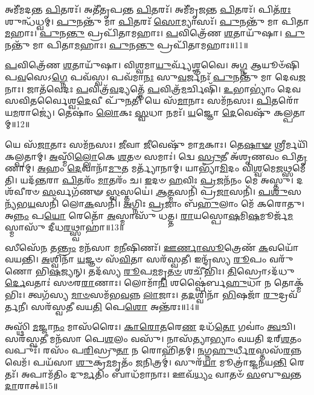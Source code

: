 𑌅𑌮𑍀᳴𑌮𑌦𑌨𑍍𑌤 \ul{𑌪𑌿}\-𑌤𑌰𑌃᳴।
𑌅𑌤𑍀᳴𑌤𑍃𑌪𑌨𑍍𑌤 \ul{𑌪𑌿}\-𑌤𑌰𑌃᳴।
𑌅𑌮𑍀᳴𑌮𑍃𑌜𑌨𑍍𑌤 \ul{𑌪𑌿}\-𑌤𑌰𑌃᳴।
𑌪𑌿𑌤᳴\-\ul{𑌰𑌃} 𑌶𑍁𑌨𑍍𑌧᳴𑌧𑍍𑌵𑌮𑍍।
\-\ul{𑌪𑍁}\-𑌨𑌨𑍍𑌤𑍁᳴ 𑌮𑌾 \ul{𑌪𑌿}\-𑌤𑌰𑌃᳴ \ul{𑌸𑍋}\-𑌮𑍍𑌯𑌾𑌸𑌃᳴।
\-\ul{𑌪𑍁}\-𑌨𑌨𑍍𑌤𑍁᳴ 𑌮𑌾 𑌪𑌿𑌤𑌾\-\ul{𑌮}\-𑌹𑌾𑌃।
\-\ul{𑌪𑍁}\-𑌨\-\ul{𑌨𑍍𑌤𑍁} 𑌪𑍍𑌰𑌪𑌿᳴𑌤𑌾𑌮𑌹𑌾𑌃।
\-\ul{𑌪}\-𑌵𑌿𑌤𑍍𑌰𑍇᳴𑌣 \ul{𑌶}\-𑌤𑌾𑌯𑍁᳴𑌷𑌾।
\-\ul{𑌪𑍁}\-𑌨𑌨𑍍𑌤𑍁᳴ 𑌮𑌾 𑌪𑌿𑌤𑌾\-\ul{𑌮}\-𑌹𑌾𑌃।
\-\ul{𑌪𑍁}\-𑌨\-\ul{𑌨𑍍𑌤𑍁} 𑌪𑍍𑌰𑌪𑌿᳴𑌤𑌾𑌮𑌹𑌾𑌃॥11॥

\-\ul{𑌪}\-𑌵𑌿𑌤𑍍𑌰𑍇᳴𑌣 \ul{𑌶}\-𑌤𑌾𑌯𑍁᳴𑌷𑌾।
𑌵𑌿\-\ul{𑌶𑍍𑌵}\-𑌮𑌾\-\ul{𑌯𑍁}\-𑌰𑍍𑌵𑍍𑌯᳴𑌶𑍍𑌞𑌵𑍈।
𑌅\-\ul{𑌗𑍍𑌨} 𑌆𑌯𑍂𑍞᳴𑌷𑌿 𑌪\-\ul{𑌵}\-𑌸𑍇\-𑌽\-\ul{𑌗𑍍𑌨𑍇} 𑌪𑌵᳴𑌸𑍍𑌵।
𑌪𑌵᳴𑌮𑌾\-\ul{𑌨𑌃} 𑌸𑍁\-\ul{𑌵}\-𑌰𑍍𑌜𑌨𑌃᳴ \ul{𑌪𑍁}\-𑌨𑌨𑍍𑌤𑍁᳴ 𑌮𑌾 𑌦𑍇𑌵\-\ul{𑌜}\-𑌨𑌾𑌃।
𑌜𑌾𑌤᳴𑌵𑍇𑌦𑌃 \ul{𑌪}\-𑌵𑌿𑌤𑍍𑌰᳴\-\ul{𑌵}\-𑌦𑍍𑌯𑌤𑍍𑌤𑍇᳴ \ul{𑌪}\-𑌵𑌿𑌤𑍍𑌰᳴\-\ul{𑌮}\-𑌰𑍍𑌚𑌿𑌷𑌿᳴।
\-\ul{𑌉}\-𑌭𑌾𑌭𑍍𑌯𑌾𑌂॑ 𑌦𑍇𑌵 𑌸𑌵𑌿𑌤𑌰𑍍𑌵𑍈𑌶𑍍𑌵\-\ul{𑌦𑍇}\-𑌵𑍀 𑌪𑍁᳴\-\ul{𑌨}\-𑌤𑍀।
𑌯𑍇 𑌸᳴\-\ul{𑌮𑌾}\-𑌨𑌾𑌃 𑌸𑌮᳴𑌨𑌸𑌃।
\-\ul{𑌪𑌿}\-𑌤𑌰𑍋᳴ 𑌯\-\ul{𑌮}\-𑌰𑌾𑌜𑍍𑌯𑍇॑।
𑌤𑍇𑌷𑌾𑌂॑ \ul{𑌲𑍋}\-𑌕𑌃 \ul{𑌸𑍍𑌵}\-𑌧𑌾 𑌨𑌮𑌃᳴।
\-\ul{𑌯}\-𑌜𑍍𑌞𑍋 \ul{𑌦𑍇}\-𑌵𑍇𑌷𑍁᳴ 𑌕𑌲𑍍𑌪𑌤𑌾𑌮𑍍॥12॥

𑌯𑍇 𑌸᳴\-\ul{𑌜𑌾}\-𑌤𑌾𑌃 𑌸𑌮᳴𑌨𑌸𑌃।
\-\ul{𑌜𑍀}\-𑌵𑌾 \ul{𑌜𑍀}\-𑌵𑍇𑌷𑍁᳴ 𑌮𑌾\-\ul{𑌮}\-𑌕𑌾𑌃।
𑌤𑍇\-\ul{𑌷𑌾}\-\-\ul{𑍟} 𑌶𑍍𑌰𑍀𑌰𑍍𑌮𑌯𑌿᳴ 𑌕𑌲𑍍𑌪𑌤𑌾𑌮𑍍।
\-\ul{𑌅}\-𑌸𑍍𑌮𑌿𑌁\-\ul{𑌲𑍍𑌲𑍋}\-𑌕𑍇 \ul{𑌶}\-𑌤𑍞 𑌸𑌮𑌾𑌃॑।
𑌦𑍍𑌵𑍇 \ul{𑌸𑍍𑌰𑍁}\-𑌤𑍀 𑌅᳴𑌶𑍃𑌣𑌵𑌂 𑌪𑌿\-\ul{𑌤𑍃}\-𑌣𑌾𑌮𑍍।
\-\ul{𑌅}\-𑌹𑌂 \ul{𑌦𑍇}\-𑌵𑌾𑌨𑌾᳴\-\ul{𑌮𑍁}\-𑌤 𑌮𑌰𑍍𑌤𑍍𑌯𑌾᳴𑌨𑌾𑌮𑍍।
𑌯𑌾𑌭𑍍𑌯𑌾᳴\-\ul{𑌮𑌿}\-𑌦𑌂 𑌵𑌿\-\ul{𑌶𑍍𑌵}\-𑌮𑍇\-\ul{𑌜}\-𑌥𑍍𑌸𑌮𑍇᳴𑌤𑌿।
𑌯𑌦᳴\-\ul{𑌨𑍍𑌤}\-𑌰𑌾 \ul{𑌪𑌿}\-𑌤𑌰𑌂᳴ \ul{𑌮𑌾}\-𑌤𑌰𑌂᳴ 𑌚।
\-\ul{𑌇}\-𑌦𑍞 \ul{𑌹}\-𑌵𑌿𑌃 \ul{𑌪𑍍𑌰}\-𑌜𑌨᳴𑌨𑌂 𑌮𑍇 𑌅𑌸𑍍𑌤𑍁।
𑌦𑌶᳴𑌵𑍀𑌰𑍞 \ul{𑌸}\-𑌰𑍍𑌵𑌗᳴𑌣𑍟 \ul{𑌸𑍍𑌵}\-𑌸𑍍𑌤𑌯𑍇॑।
\-\ul{𑌆}\-\-\ul{𑌤𑍍𑌮}\-𑌸𑌨𑌿᳴ 𑌪𑍍𑌰\-\ul{𑌜𑌾}\-𑌸𑌨𑌿᳴।
\-\ul{𑌪}\-\-\ul{𑌶𑍁}\-𑌸𑌨𑍍𑌯᳴𑌭\-\ul{𑌯}\-𑌸𑌨𑌿᳴ 𑌲𑍋\-\ul{𑌕}\-𑌸𑌨𑌿᳴।
\-\ul{𑌅}\-𑌗𑍍𑌨𑌿𑌃 \ul{𑌪𑍍𑌰}\-𑌜𑌾𑌂 𑌬᳴\-\ul{𑌹𑍁}\-𑌲𑌾𑌂 𑌮𑍇᳴ 𑌕𑌰𑍋𑌤𑍁।
𑌅\-\ul{𑌨𑍍𑌨𑌂} 𑌪\-\ul{𑌯𑍋} 𑌰𑍇𑌤𑍋᳴ \ul{𑌅}\-𑌸𑍍𑌮𑌾𑌸𑍁᳴ 𑌧𑌤𑍍𑌤।
\-\ul{𑌰𑌾}\-𑌯𑌸𑍍𑌪𑍋\-\ul{𑌷}\-𑌮𑌿\-\ul{𑌷}\-𑌮𑍂𑌰𑍍𑌜᳴\-\ul{𑌮}\-𑌸𑍍𑌮𑌾𑌸𑍁᳴ 𑌦𑍀𑌧\-\ul{𑌰}\-𑌥𑍍𑌸𑍍𑌵𑌾𑌹𑌾॑॥13॥\anuvakamend[\-\ul{𑌇}\-\-\ul{𑌨𑍍𑌦𑍍𑌰𑌿}\-𑌯𑌾𑌯᳴ \ul{𑌪𑌿}\-𑌤𑌰𑌃᳴ \ul{𑌶}\-𑌤𑌾𑌯𑍁᳴𑌷𑌾 \ul{𑌪𑍁}\-𑌨𑌨𑍍𑌤𑍁᳴ 𑌮𑌾 𑌪𑌿𑌤𑌾\-\ul{𑌮}\-𑌹𑌾𑌃 \ul{𑌪𑍁}\-𑌨\-\ul{𑌨𑍍𑌤𑍁} 𑌪𑍍𑌰𑌪𑌿᳴𑌤𑌾𑌮𑌹𑌾𑌃 𑌕𑌲𑍍𑌪𑌤𑌾𑍟 \ul{𑌸𑍍𑌵}\-𑌸𑍍𑌤\-\ul{𑌯𑍇} 𑌪𑌞𑍍𑌚᳴ 𑌚]

𑌸𑍀𑌸𑍇᳴\-\ul{𑌨} 𑌤\-\ul{𑌨𑍍𑌤𑍍𑌰𑌂} 𑌮𑌨᳴𑌸𑌾 𑌮\-\ul{𑌨𑍀}\-𑌷𑌿𑌣𑌃᳴।
\-\ul{𑌊}\-\-\ul{𑌰𑍍𑌣𑌾}\-\-\ul{𑌸𑍂}\-𑌤𑍍𑌰𑍇𑌣᳴ \ul{𑌕}\-𑌵𑌯𑍋᳴ 𑌵𑌯𑌨𑍍𑌤𑌿।
\-\ul{𑌅}\-𑌶𑍍𑌵𑌿𑌨𑌾᳴ \ul{𑌯}\-𑌜𑍍𑌞𑍞 𑌸᳴\-\ul{𑌵𑌿}\-𑌤𑌾 𑌸𑌰᳴𑌸𑍍𑌵𑌤𑍀।
𑌇𑌨𑍍𑌦𑍍𑌰᳴𑌸𑍍𑌯 \ul{𑌰𑍂}\-𑌪𑌂 𑌵𑌰𑍁᳴𑌣𑍋 𑌭𑌿\-\ul{𑌷}\-𑌜𑍍𑌯𑌨𑍍।
𑌤𑌦᳴𑌸𑍍𑌯 \ul{𑌰𑍂}\-𑌪\-\ul{𑌮}\-𑌮𑍃\-\ul{𑌤}\-\-\ul{𑍞} 𑌶𑌚𑍀᳴𑌭𑌿𑌃।
\-\ul{𑌤𑌿}\-𑌸𑍍𑌰𑍋\-𑌽𑌦᳴𑌧𑍁\-\ul{𑌰𑍍𑌦𑍇}\-𑌵𑌤𑌾𑌃॑ 𑌸𑍞𑌰\-\ul{𑌰𑌾}\-𑌣𑌾𑌃।
𑌲𑍋𑌮𑌾᳴\-\ul{𑌨𑌿} 𑌶𑌷𑍍𑌪𑍈॑𑌰𑍍𑌬\-\ul{𑌹𑍁}\-𑌧𑌾 𑌨 𑌤𑍋𑌕𑍍𑌮᳴𑌭𑌿𑌃।
𑌤𑍍𑌵𑌗᳴𑌸𑍍𑌯 \ul{𑌮𑌾}\-\-\ul{𑍞}\-𑌸𑌮᳴𑌭\-\ul{𑌵}\-𑌨𑍍𑌨 \ul{𑌲𑌾}\-𑌜𑌾𑌃।
𑌤\-\ul{𑌦}\-𑌶𑍍𑌵𑌿𑌨𑌾᳴ \ul{𑌭𑌿}\-𑌷𑌜𑌾᳴ \ul{𑌰𑍁}\-𑌦𑍍𑌰𑌵᳴𑌰𑍍𑌤𑌨𑍀।
𑌸𑌰᳴𑌸𑍍𑌵𑌤𑍀 𑌵𑌯\-\ul{𑌤𑌿} 𑌪𑍇\-\ul{𑌶𑍋} 𑌅𑌨𑍍𑌤᳴𑌰𑌃॥14॥

𑌅𑌸𑍍𑌥𑌿᳴ \ul{𑌮}\-𑌜𑍍𑌜𑌾\-\ul{𑌨𑌂} 𑌮𑌾𑌸᳴𑌰𑍈𑌃।
\-\ul{𑌕𑌾}\-\-\ul{𑌰𑍋}\-\-\ul{𑌤}\-𑌰𑍇\-\ul{𑌣} 𑌦𑌧᳴\-\ul{𑌤𑍋} 𑌗𑌵𑌾𑌂॑ \ul{𑌤𑍍𑌵}\-𑌚𑌿।
𑌸𑌰᳴𑌸𑍍𑌵\-\ul{𑌤𑍀} 𑌮𑌨᳴𑌸𑌾 𑌪𑍇\-\ul{𑌶}\-𑌲𑌂 𑌵𑌸𑍁᳴।
𑌨𑌾𑌸᳴𑌤𑍍𑌯𑌾𑌭𑍍𑌯𑌾𑌂 𑌵𑌯𑌤𑌿 𑌦𑌰𑍍‌\mbox{}\-\ul{𑌶}\-𑌤𑌂 𑌵𑌪𑍁𑌃᳴।
𑌰𑌸𑌂᳴ 𑌪\-\ul{𑌰𑌿}\-𑌸𑍍𑌰𑍁\-\ul{𑌤𑌾} 𑌨 𑌰𑍋𑌹𑌿᳴𑌤𑌮𑍍।
\-\ul{𑌨}\-𑌗𑍍𑌨\-\ul{𑌹𑍁}\-𑌰𑍍𑌧𑍀\-\ul{𑌰}\-𑌸𑍍𑌤𑌸᳴\-\ul{𑌰}\-𑌨𑍍𑌨 𑌵𑍇𑌮᳴।
𑌪𑌯᳴𑌸𑌾 \ul{𑌶𑍁}\-𑌕𑍍𑌰\-\ul{𑌮}\-𑌮𑍃𑌤𑌂᳴ \ul{𑌜}\-𑌨𑌿𑌤𑍍𑌰𑌮𑍍॑।
𑌸𑍁𑌰᳴\-\ul{𑌯𑌾} 𑌮𑍂𑌤𑍍𑌰𑌾॑𑌜𑍍𑌜𑌨𑌯\-\ul{𑌨𑍍𑌤𑌿} 𑌰𑍇𑌤𑌃᳴।
𑌅𑌪𑌾𑌮᳴𑌤𑌿𑌂 𑌦𑍁\-\ul{𑌰𑍍𑌮}\-𑌤𑌿𑌂 𑌬𑌾𑌧᳴𑌮𑌾𑌨𑌾𑌃।
𑌊𑌵᳴\-\ul{𑌧𑍍𑌯𑌂} 𑌵𑌾𑌤𑍞᳴ \ul{𑌸}\-𑌬𑍁\-\ul{𑌵}\-𑌨𑍍𑌤\-\ul{𑌦𑌾}\-𑌰𑌾𑌤𑍍॥15॥

